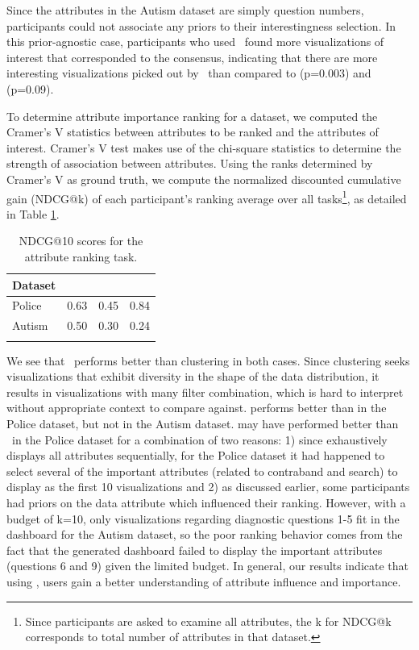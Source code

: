 \par Since the attributes in the Autism dataset are simply question numbers, participants could not associate any priors to their interestingness selection. In this prior-agnostic case, participants who used \system\ found more visualizations of interest that corresponded to the consensus, indicating that there are more interesting visualizations picked out by \system\ than compared to \BFS (p=0.003) and \cluster (p=0.09).

To determine attribute importance ranking for a dataset, we computed the Cramer's V statistics between attributes to be ranked and the attributes of interest. Cramer's V test makes use of the chi-square statistics to determine the strength of association between attributes. Using the ranks determined by Cramer's V as ground truth, we compute the normalized discounted cumulative gain (NDCG@k) of each participant's ranking average over all tasks\footnote{Since participants are asked to examine all attributes, the k for NDCG@k corresponds to total number of attributes in that dataset.}, as detailed in Table \ref{table:ndcgRankingResult}.
\begin{table}[ht!]
	\centering
	\begin{tabular}{lrrr}
	\hline
	 Dataset   &   \system &   \cluster &   \BFS \\
	\hline
	 Police    &      0.63 &      0.45 &  0.84 \\
	 Autism    &      0.50 &      0.30 &  0.24 \\
	\hline
	\label{table:ndcg_ranking_result}
	\end{tabular}
	\caption{NDCG@10 scores for the attribute ranking task.}
	\vspace{-20pt}
    \label{table:ndcgRankingResult}
\end{table}
We see that \system\ performs better than clustering in both cases. Since clustering seeks visualizations that exhibit diversity in the shape of the data distribution, it results in visualizations with many filter combination, which is hard to interpret without appropriate context to compare against. \BFS performs better than \system in the Police dataset, but not in the Autism dataset. \BFS may have performed better than \system\ in the Police dataset for a combination of two reasons: 1) since \BFS exhaustively displays all attributes sequentially, for the Police dataset it had happened to select several of the important attributes (related to contraband and search) to display as the first 10 visualizations and 2) as discussed earlier, some participants had priors on the data attribute which influenced their ranking. However, with a budget of k=10, only visualizations regarding diagnostic questions 1-5 fit in the dashboard for the Autism dataset, so the poor ranking behavior comes from the fact that the \BFS generated dashboard failed to display the important attributes (questions 6 and 9) given the limited budget. In general, our results indicate that using \system, users gain a better understanding of attribute influence and importance.
